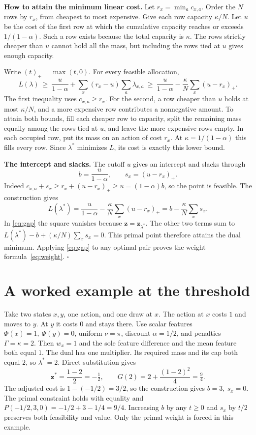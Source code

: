 \documentclass[12pt,a4paper]{article}
\newcommand{\lead}[1]{\par\smallskip\noindent\textbf{#1}\enspace}
\begin{document}
\lead{How to attain the minimum linear cost.}
Let \(r_x=\min_a c_{x,a}\). Order the \(N\) rows by \(r_x\), from cheapest
to most expensive. Give each row capacity \(\kappa/N\). Let \(u\) be the cost of the first row
at which the cumulative capacity reaches or exceeds \(1/(1-\alpha)\).
Such a row exists because the total capacity is \(\kappa\). The rows strictly
cheaper than \(u\) cannot hold all the mass, but including the rows tied at
\(u\) gives enough capacity.

Write \((t)_+=\max(t,0)\). For every feasible allocation,
\[
 L(\lambda)\ \ge\ \frac{u}{1-\alpha}+\sum_x(r_x-u)\sum_a\lambda_{x,a}
                  \ \ge\ \frac{u}{1-\alpha}-\frac{\kappa}{N}\sum_x(u-r_x)_+ .
\]
The first inequality uses \(c_{x,a}\ge r_x\). For the second, a row cheaper
than \(u\) holds at most \(\kappa/N\), and a more expensive row contributes a
nonnegative amount. To attain both bounds, fill each cheaper row to capacity,
split the remaining mass equally among the rows tied at \(u\), and leave
the more expensive rows empty. In each occupied row, put its mass on an action
of cost \(r_x\). At \(\kappa=1/(1-\alpha)\) this fills every row. Since \(\lambda^*\)
minimizes \(L\), its cost is exactly this lower bound.

\lead{The intercept and slacks.}
The cutoff \(u\) gives an intercept and slacks through
\[
               b=\frac{u}{1-\alpha},\qquad s_x=(u-r_x)_+ .
\]
Indeed \(c_{x,a}+s_x\ge r_x+(u-r_x)_+\ge u=(1-\alpha)b\), so the point is feasible.
The construction gives
\[
      L(\lambda^*)=\frac{u}{1-\alpha}-\frac{\kappa}{N}\sum_x(u-r_x)_+=b-\frac{\kappa}{N}\sum_x s_x .
\]
In \eqref{eq:gap} the square vanishes because \(\mathbf z=\mathbf z_{\lambda^*}\).
The other two terms sum to \(L(\lambda^*)-b+(\kappa/N)\sum_x s_x=0\).
This primal point therefore attains the dual minimum. Applying
\eqref{eq:gap} to any optimal pair proves the weight formula~\eqref{eq:weight}.
\hfill\(\square\)

\newpage
\section*{A worked example at the threshold}
Take two states \(x,y\), one action, and one draw at \(x\). The action at
\(x\) costs \(1\) and moves to \(y\). At \(y\) it costs \(0\) and stays
there. Use scalar features \(\Phi(x)=1,\ \Phi(y)=0\), uniform
\(\nu=\pi\), discount \(\alpha=1/2\), and penalties \(\Gamma=\kappa=2\).
Then \(w_x=1\) and the sole feature difference and the mean feature both
equal \(1\). The dual has one multiplier. Its required mass and its cap
both equal \(2\), so \(\lambda^*=2\). Direct substitution gives
\[
     \mathbf z^*=\frac{1-2}{2}=-\tfrac12,\qquad
     G(2)=2+\frac{(1-2)^2}{4}=\tfrac94 .
\]
The adjusted cost is \(1-(-1/2)=3/2\), so the construction gives
\(b=3,\ s_x=0\). The primal constraint holds with equality and
\(P(-1/2,3,0)=-1/2+3-1/4=9/4\).
Increasing \(b\) by any \(t\ge0\) and \(s_x\) by \(t/2\) preserves both
feasibility and value. Only the primal weight is forced in this example.
\end{document}
